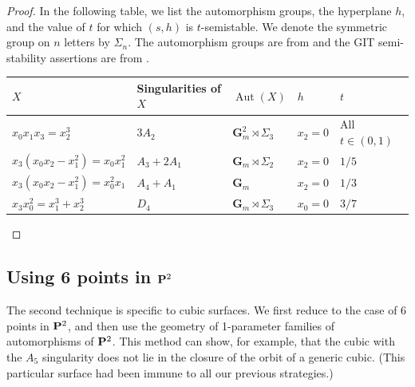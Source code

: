 \documentclass[reqno]{amsart}
\renewcommand {\P}{{\bf P}}
\providecommand{\Aut}{\operatorname{Aut}}
\numberwithin{equation}{section}
\newcommand{\G}{\mathbf{G}}
\begin{document}
\begin{proof}
  In the following table, we list the automorphism groups, the hyperplane $h$, and the value of $t$ for which $(s,h)$ is $t$-semistable.
  We denote the symmetric group on $n$ letters by $\Sigma_n$.
  The automorphism groups are from \cite{sak:10} and the GIT semi-stability assertions are from \cite{gal.mar:19}.
  \begin{center}
  \begin{tabular}{l l l l l}
    \toprule
    $X$ & Singularities of $X$& $\Aut(X)$ & $h$ & $t$\\
    \midrule
    $x_0x_1x_3 = x_2^3$& $3A_2$&$\G_m^2 \rtimes \Sigma_3$ & $x_2 = 0$ & All $t \in (0,1)$\\
    $x_3(x_0x_2-x_1^2) = x_0x_1^2$& $A_3+2A_1$&$\G_m \rtimes \Sigma_2$ & $x_2 = 0$ & $1/5$ \\
    $x_3(x_0x_2-x_1^2) = x_0^2x_1$&$A_4+A_1$& $\G_m$ & $x_2 = 0$ & $1/3$\\
    $x_3x_0^2 = x_1^3 + x_2^3$&$D_4$& $\G_m \rtimes \Sigma_3$ & $x_0 = 0$ & $3/7$\\
    \bottomrule
  \end{tabular}
\end{center}
\end{proof}

\subsection{Using 6 points in $\P^2$}
The second technique is specific to cubic surfaces.
We first reduce to the case of 6 points in $\P^2$, and then use the geometry of 1-parameter families of automorphisms of $\P^2$.
This method can show, for example, that the cubic with the $A_5$ singularity does not lie in the closure of the orbit of a generic cubic.
(This particular surface had been immune to all our previous strategies.)
\end{document}
